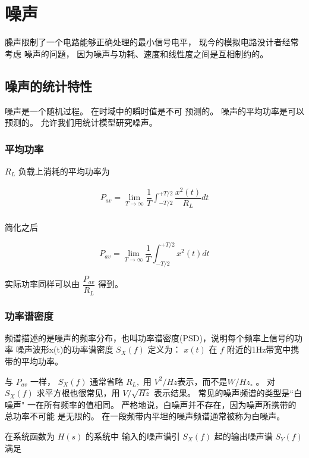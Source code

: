 \documentclass[cn,11pt,chinese,black,simple]{../elegantbook}
\begin{document}
\fi 

\chapter{噪声}


臊声限制了一个电路能够正确处理的最小信号电平， 现今的模拟电路没计者经常考虑
噪声的问題， 因为噪声与功耗、速度和线性度之间是互相制约的。

\section{噪声的统计特性}

噪声是一个随机过程。
在时域中的瞬时值是不可
预测的。
噪声的平均功率是可以
预测的。
允许我们用统计模型研究噪声。

\subsection{平均功率}

\(R_L\) 负载上消耗的平均功率为

$$\begin{array}{l}
    P_{a v}=\lim _{T \rightarrow \infty} \dfrac{1}{T} \int_{-T / 2}^{+T / 2} \dfrac{x^{2}(t)}{R_{L}} d t \\
    
\end{array}$$

简化之后

\[P_{a v}=\lim _{T \rightarrow \infty} \dfrac{1}{T} \int_{-T / 2}^{+T / 2} x^{2}(t) d t\]

实际功率同样可以由 \(\dfrac{P_{av}}{R_L}\) 得到。

\subsection{功率谱密度}

频谱描述的是噪声的频率分布，也叫功率谱密度(PSD)，说明每个频率上信号的功率
噪声波形x(t)的功率谱密度 \(S_{X}(f)\) 定义为：
\(x(t)\) 在 \(f\) 附近的1Hz带宽中携带的平均功率。

与 \(P_{a v}\) 一样， \(S_{X}(f)\) 通常省略 \(R_{L},\) 用 \(V^{2} / H z\)表示，而不是\(W / H z_{\circ}\) 。
对 \(S_{X}(f)\) 求平方根也很常见，用 \(V / \sqrt{H z}\) 表示结果。
常见的噪声频谱的类型是“白噪声" 一在所有频率的值相同。
严格地说，白噪声并不存在，因为噪声所携带的总功率不可能
是无限的。
在一段频带内平坦的噪声频谱通常被称为白噪声。

在系统函数为 \(H(s)\) 的系统中 输入的噪声谱引 \(S_X(f)\) 起的输出噪声谱 \(S_Y(f)\) 满足 
\end{document}
